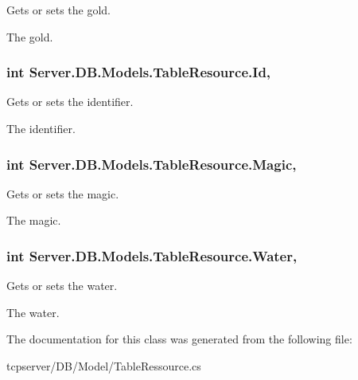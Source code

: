 Gets or sets the gold. 

The gold.\hypertarget{classServer_1_1DB_1_1Models_1_1TableResource_aa5c47b8d7a24033e408f2166ef37f0ba}{}
\subsubsection[{Id}]{\setlength{\rightskip}{0pt plus 5cm}int Server.\+D\+B.\+Models.\+Table\+Resource.\+Id\hspace{0.3cm}{\ttfamily [get]}, {\ttfamily [set]}}\label{classServer_1_1DB_1_1Models_1_1TableResource_aa5c47b8d7a24033e408f2166ef37f0ba}


Gets or sets the identifier. 

The identifier.\hypertarget{classServer_1_1DB_1_1Models_1_1TableResource_a20c66e21806b6d86d0172a8ee3e9fcbc}{}
\subsubsection[{Magic}]{\setlength{\rightskip}{0pt plus 5cm}int Server.\+D\+B.\+Models.\+Table\+Resource.\+Magic\hspace{0.3cm}{\ttfamily [get]}, {\ttfamily [set]}}\label{classServer_1_1DB_1_1Models_1_1TableResource_a20c66e21806b6d86d0172a8ee3e9fcbc}


Gets or sets the magic. 

The magic.\hypertarget{classServer_1_1DB_1_1Models_1_1TableResource_a38f7464475a01c1e01240c3200af6f37}{}
\subsubsection[{Water}]{\setlength{\rightskip}{0pt plus 5cm}int Server.\+D\+B.\+Models.\+Table\+Resource.\+Water\hspace{0.3cm}{\ttfamily [get]}, {\ttfamily [set]}}\label{classServer_1_1DB_1_1Models_1_1TableResource_a38f7464475a01c1e01240c3200af6f37}


Gets or sets the water. 

The water.

The documentation for this class was generated from the following file\+:\begin{DoxyCompactItemize}
\item 
tcpserver/\+D\+B/\+Model/Table\+Ressource.\+cs\end{DoxyCompactItemize}
